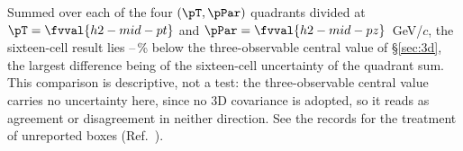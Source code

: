
Summed over each of the four $(\pT,\pPar)$ quadrants divided at $\pT=\fvval{h2-mid-pt}$ and $\pPar=\fvval{h2-mid-pz}$~GeV/$c$, the sixteen-cell result lies --\,\% below the three-observable central value of \S\ref{sec:3d}, the largest difference being  of the sixteen-cell uncertainty of the quadrant sum. This comparison is descriptive, not a test: the three-observable central value carries no uncertainty here, since no 3D covariance is adopted, so it reads as agreement or disagreement in neither direction. See the records for the treatment of unreported boxes (Ref.~\cite{NoteRecords2026}).


